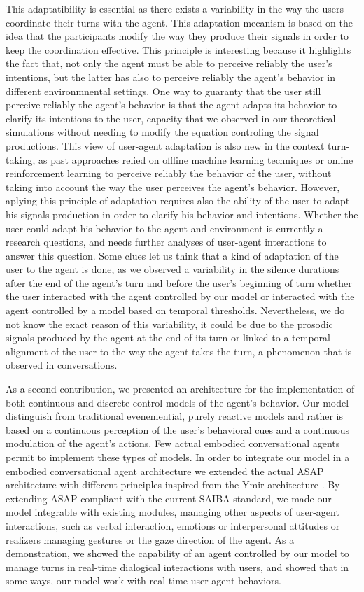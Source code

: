 This adaptatibility is essential as there exists a variability in the way the users coordinate their turns with the agent. This adaptation mecanism is based on the idea that the participants modify the way they produce their signals in order to keep the coordination effective. This principle is interesting because it highlights the fact that, not only the agent must be able to perceive reliably the user's intentions, but the latter has also to perceive reliably the agent's behavior in different environmnental settings. One way to guaranty that the user still perceive reliably the agent's behavior is that the agent adapts its behavior to clarify its intentions to the user, capacity that we observed in our theoretical simulations without needing to modify the equation controling the signal productions. This view of user-agent adaptation is also new in the context turn-taking, as past approaches relied on offline machine learning techniques or online reinforcement learning to perceive reliably the behavior of the user, without taking into account the way the user perceives the agent's behavior. 
However, aplying this principle of adaptation requires also the ability of the user to adapt his signals production in order to clarify his behavior and intentions. Whether the user could adapt his behavior to the agent and environment is currently a research questions, and needs further analyses of user-agent interactions to answer this question. Some clues let us think that a kind of adaptation of the user to the agent is done, as we observed a variability in the silence durations after the end of the agent's turn and before the user's beginning of turn whether the user interacted with the agent controlled by our model or interacted with the agent controlled by a model based on temporal thresholds. Nevertheless, we do not know the exact reason of this variability, it could be due to the prosodic signals produced by the agent at the end of its turn or linked to a temporal alignment of the user to the way the agent takes the turn, a phenomenon that is observed in conversations. 

As a second contribution, we presented an architecture for the implementation of both continuous and discrete control models of the agent's behavior. Our model distinguish from traditional evenemential, purely reactive models and rather is based on a continuous perception of the user's behavioral cues and a continuous modulation of the agent's actions. Few actual embodied conversational agents permit to implement these types of models. In order to integrate our model in a embodied conversational agent architecture we extended the actual ASAP architecture \cite{kopp_architecture_2014} with different principles inspired from the Ymir architecture \citep{thorisson_mind_1999}. By extending ASAP compliant with the current SAIBA standard, we made our model integrable with existing modules, managing other aspects of user-agent interactions, such as verbal interaction, emotions or interpersonal attitudes or realizers managing gestures or the gaze direction of the agent. As a demonstration, we showed the capability of an agent controlled by our model to manage turns in real-time dialogical interactions with users, and showed that in some ways, our model work with real-time user-agent behaviors. 

